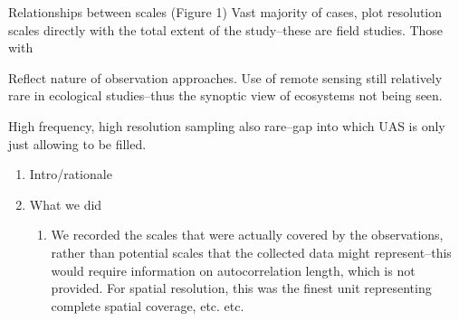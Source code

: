 \documentclass[12pt]{article}
\begin{document}
Relationships between scales (Figure 1)
Vast majority of cases, plot resolution scales directly with the total extent of the study--these are field studies.  Those with 

Reflect nature of observation approaches. 
Use of remote sensing still relatively rare in ecological studies--thus the synoptic view of ecosystems not being seen.  

High frequency, high resolution sampling also rare--gap into which UAS is only just allowing to be filled. 

\begin{enumerate}
 \item Intro/rationale 
   \item{What we did}
   \begin{enumerate}
    \item We recorded the scales that were actually covered by the observations, rather than potential scales that the collected data might represent--this would require information on autocorrelation length, which is not provided. 
    \subitem For spatial resolution, this was the finest unit representing complete spatial coverage, etc. etc. 

\end{enumerate}
\end{enumerate}
\end{document}
